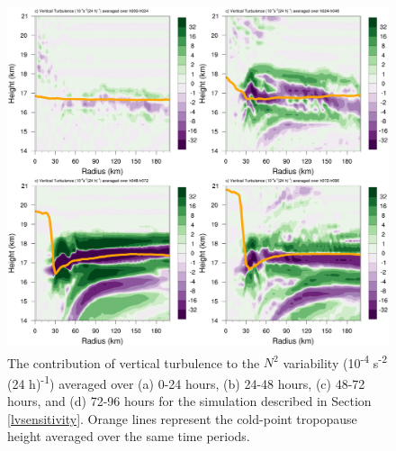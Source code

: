\begin{figure}[ht]
\centerline{\includegraphics[width=39pc]{figures/turb-50m.png}}
\caption{The contribution of vertical turbulence to the $N^2$ variability (10\textsuperscript{-4} s\textsuperscript{-2} (24 h)\textsuperscript{-1}) averaged over (a) 0-24 hours, (b) 24-48 hours, (c) 48-72 hours, and (d) 72-96 hours for the simulation described in Section \ref{lvsensitivity}. Orange lines represent the cold-point tropopause height averaged over the same time periods.}
\label{fig:turb-50m}
\end{figure}

